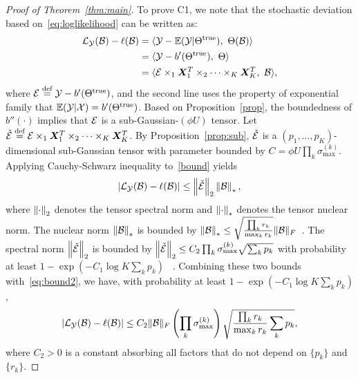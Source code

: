 \documentclass[12pt]{article}
\theoremstyle{definition}
\theoremstyle{definition}
\begin{document}
\begin{proof}[Proof of Theorem~\ref{thm:main}]
To prove C1, we note that the stochastic deviation based on~\eqref{eq:loglikelihood} can be written as:
\begin{align}\label{bound}
\tL_{\tY}(\tB)-\ell(\tB)&=\langle \tY-\mathbb{E}(\tY|\trueT),\ \Theta(\tB)\rangle\notag \\
&= \langle \tY- b'(\trueT),\ \Theta\rangle \notag \\
&= \langle \tE\times_1\mX^T_1\times_2\cdots\times_K\mX^T_K,\ \tB\rangle,
\end{align}
where $\mathcal{E}\stackrel{\text{def}}{=}\mathcal{Y}-b'(\Theta^{\text{true}})$, and the second line uses the property of exponential family that $\mathbb{E}(\mathcal{Y}|\mathcal{X})=b'(\Theta^{\text{true}})$. Based on Proposition~\ref{prop}, the boundedness of $b''(\cdot)$ implies that $\mathcal{E}$ is a sub-Gaussian-$(\phi U)$ tensor. Let $\check{\mathcal{E}}\stackrel{\text{def}}{=}\mathcal{E}\times_1\bm X^T_1\times_2\cdots\times_K\bm X^T_K$. By Proposition~\ref{prop:sub}, $\check {\mathcal{E}}$ is a $(p_1,\ldots,p_K)$-dimensional sub-Gaussian tensor with parameter bounded by $C=\phi U\prod_k \sigma_{\text{max}}^{(k)}$. Applying Cauchy-Schwarz inequality to~\eqref{bound} yields
\begin{equation}\label{eq:bound2}
|\mathcal{L}_{\mathcal{Y}}(\mathcal{B})-\ell(\mathcal{B})|\leq \left\lVert\check {\mathcal{E}}\right\rVert_2 \left\lVert\mathcal{B}\right\rVert_*,
\end{equation}
where $\left\lVert\cdot\right\rVert_2$ denotes the tensor spectral norm and $\left\lVert\cdot\right\rVert_*$ denotes the tensor nuclear norm. The nuclear norm $\left\lVert\mathcal{B}\right\rVert_*$ is  bounded by $\left\lVert\mathcal{B}\right\rVert_*\leq \sqrt{{\prod_k r_k \over \max_k r_k}}\lVert\mathcal{B}\rVert_F$~\citep{wang2017operator,wang2018learning}. The spectral norm $\left\lVert\check {\mathcal{E}}\right\rVert_2$ is bounded by $\left\lVert\check {\mathcal{E}}\right\rVert_2\leq C_2\prod_k \sigma_{\text{max}}^{(k)} \sqrt{\sum_k p_k}$ with probability at least $1-\exp(-C_1\log K \sum_kp_k)$ ~\citep{tomioka2014spectral}. Combining these two bounds with~\eqref{eq:bound2}, we have, with probability at least $1-\exp(-C_1\log K \sum_kp_k)$, 
\[
|\mathcal{L}_{\mathcal{Y}}(\mathcal{B})-\ell(\mathcal{B})|\leq C_2\lVert\mathcal{B}\rVert_F\left(\prod_k \sigma_{\text{max}}^{(k)}\right)  \sqrt{ {\prod_k r_k\over \max_k r_k}\sum_k p_k},
\]
where $C_2>0$ is a constant absorbing all factors that do not depend on $\{p_k\}$ and $\{r_k\}$. 


\end{proof}
\end{document}
